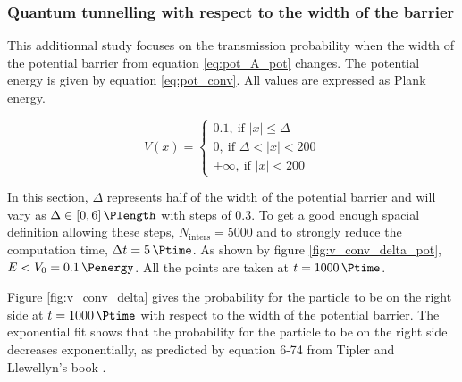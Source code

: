\documentclass[a4paper,12pt,twoside]{article}
\begin{document}
      \subsubsection{Quantum tunnelling with respect to the width of the barrier}
        This additionnal study focuses on the transmission probability when the width of the potential barrier from equation \eqref{eq:pot_A_pot} changes.
        The potential energy is given by equation \eqref{eq:pot_conv}.
        All values are expressed as Plank energy.

        \begin{equation}
          V(x) =
          \begin{cases}
            0.1,~\text{if $|x| \leq \Delta$}\\
            0,~\text{if $\Delta < |x| < 200$}\\
            +\infty,~\text{if $|x| < 200$}
          \end{cases}
          \label{eq:pot_conv}
        \end{equation}

        In this section, $\Delta$ represents half of the width of the potential barrier and will vary as $\Delta \in \left[0, 6\right] \si{\Plength}$ with steps of \SI{0.3}{\Plength}.
        To get a good enough spacial definition allowing these steps, $N_\text{inters} = \num{5000}$ and to strongly reduce the computation time, $\Delta t = \SI{5}{\Ptime}$.
        As shown by figure \ref{fig:v_conv_delta_pot}, $E<V_0=\SI{0.1}{\Penergy}$.
        All the points are taken at $t = \SI{1000}{\Ptime}$.

        Figure \ref{fig:v_conv_delta} gives the probability for the particle to be on the right side at $t = \SI{1000}{\Ptime}$ with respect to the width of the potential barrier.
        The exponential fit shows that the probability for the particle to be on the right side decreases exponentially, as predicted by equation 6-74 from Tipler and Llewellyn's book \cite{tipler-llewellyn}.
\end{document}
